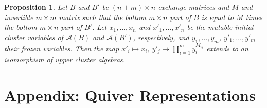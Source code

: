 \documentclass[12pt]{amsart}
\newcommand{\cA}{\mathcal{A}}
\newtheorem{proposition}[theorem]{Proposition}
\numberwithin{equation}{section}
\begin{document}
\begin{proposition}\label{prop:changeofcoeffs}
Let $B$ and $B'$ be $(n+m)\times n$ exchange matrices and $M$ and invertible $m \times m$ matrix such that the bottom $m \times n$ part of $B$ is equal to $M$ times the bottom $m \times n$ part of $B'$.  Let $x_1,\dotsc,x_n$ and $x'_1,\dotsc,x'_n$ be the mutable initial cluster variables of $\cA(B)$ and $\cA(B')$, respectively, and $y_1,\dotsc,y_m$, $y'_1,\dotsc, y'_m$ their frozen variables.  Then the map $x'_i \mapsto x_i$, $y'_j \mapsto \prod_{i=1}^m y_i^{M_{ij}}$ extends to an isomorphism of upper cluster algebras.
\end{proposition}


\section{Appendix: Quiver Representations}
\end{document}
